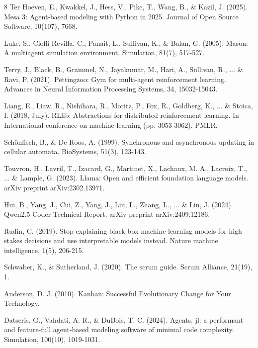 \documentclass[runningheads]{llncs}
\begin{document}
\begin{thebibliography}{8}
Ter Hoeven, E., Kwakkel, J., Hess, V., Pike, T., Wang, B., \& Kazil, J. (2025). Mesa 3: Agent-based modeling with Python in 2025. Journal of Open Source Software, 10(107), 7668. 

Luke, S., Cioffi-Revilla, C., Panait, L., Sullivan, K., \& Balan, G. (2005). Mason: A multiagent simulation environment. Simulation, 81(7), 517-527. 

Terry, J., Black, B., Grammel, N., Jayakumar, M., Hari, A., Sullivan, R., ... \& Ravi, P. (2021). Pettingzoo: Gym for multi-agent reinforcement learning. Advances in Neural Information Processing Systems, 34, 15032-15043.

Liang, E., Liaw, R., Nishihara, R., Moritz, P., Fox, R., Goldberg, K., ... \& Stoica, I. (2018, July). RLlib: Abstractions for distributed reinforcement learning. In International conference on machine learning (pp. 3053-3062). PMLR. 

Schönfisch, B., \& De Roos, A. (1999). Synchronous and asynchronous updating in cellular automata. BioSystems, 51(3), 123-143. 

Touvron, H., Lavril, T., Izacard, G., Martinet, X., Lachaux, M. A., Lacroix, T., ... \& Lample, G. (2023). Llama: Open and efficient foundation language models. arXiv preprint arXiv:2302.13971. 

Hui, B., Yang, J., Cui, Z., Yang, J., Liu, L., Zhang, L., ... \& Lin, J. (2024). Qwen2.5-Coder Technical Report. arXiv preprint arXiv:2409.12186. 

Rudin, C. (2019). Stop explaining black box machine learning models for high stakes decisions and use interpretable models instead. Nature machine intelligence, 1(5), 206-215. 

Schwaber, K., \& Sutherland, J. (2020). The scrum guide. Scrum Alliance, 21(19), 1.

Anderson, D. J. (2010). 
Kanban: Successful Evolutionary Change for Your Technology.

Datseris, G., Vahdati, A. R., \& DuBois, T. C. (2024). Agents. jl: a performant and feature-full agent-based modeling software of minimal code complexity. Simulation, 100(10), 1019-1031. 


\end{thebibliography}
\end{document}
